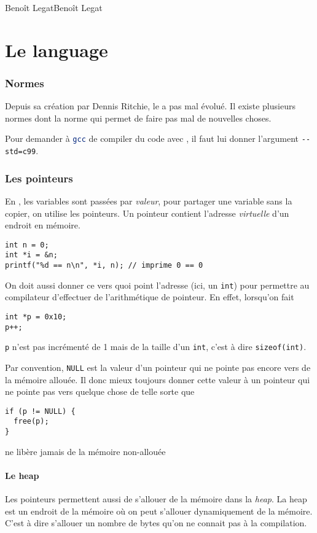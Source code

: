 


{Beno\^it Legat}{Beno\^it Legat}

\part{Le language \clang{}}
\section{Normes}
Depuis sa création par Dennis Ritchie,
le \clang{} a pas mal évolué.
Il existe plusieurs normes dont la norme  qui permet
de faire pas mal de nouvelles choses.

Pour demander à \lstinline[language=bash]|gcc|
de compiler du code avec ,
il faut lui donner l'argument \lstinline[language=bash]|--std=c99|.

\section{Les pointeurs}
En \clang{}, les variables sont passées par \emph{valeur},
pour partager une variable sans la copier, on utilise les pointeurs.
Un pointeur contient l'adresse \emph{virtuelle} d'un endroit en mémoire.
\begin{lstlisting}
int n = 0;
int *i = &n;
printf("%d == n\n", *i, n); // imprime 0 == 0
\end{lstlisting}
On doit aussi donner ce vers quoi point l'adresse (ici, un \lstinline|int|)
pour permettre au compilateur d'effectuer de l'arithmétique de pointeur.
En effet, lorsqu'on fait
\begin{lstlisting}
int *p = 0x10;
p++;
\end{lstlisting}
\lstinline|p| n'est pas incrémenté de 1 mais de la taille d'un
\lstinline|int|, c'est à dire \lstinline|sizeof(int)|.

Par convention, \lstinline|NULL| est la valeur d'un pointeur qui
ne pointe pas encore vers de la mémoire allouée.
Il donc mieux toujours donner cette valeur à un pointeur qui ne pointe
pas vers quelque chose de telle sorte que
\begin{lstlisting}
if (p != NULL) {
  free(p);
}
\end{lstlisting}
ne libère jamais de la mémoire non-allouée

\subsection{Le heap}
Les pointeurs permettent aussi de s'allouer de la mémoire dans la \emph{heap}.
La heap est un endroit de la mémoire où on peut s'allouer dynamiquement
de la mémoire.
C'est à dire s'allouer un nombre de bytes
qu'on ne connait pas à la compilation.


